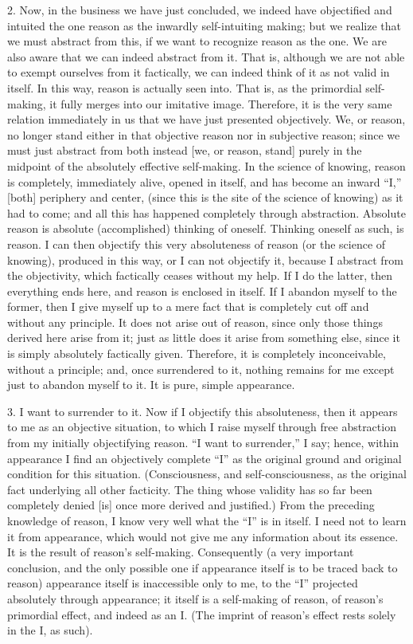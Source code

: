 2. Now, in the business we have just concluded,
we indeed have objectified and intuited the one reason
as the inwardly self-intuiting making;
but we realize that we must abstract from this,
if we want to recognize reason as the one.
We are also aware that we can indeed abstract from it.
That is, although we are not able
to exempt ourselves from it factically,
we can indeed think of it as not valid in itself.
In this way, reason is actually seen into.
That is, as the primordial self-making,
it fully merges into our imitative image.
Therefore, it is the very same relation
immediately in us that we have just presented objectively.
We, or reason, no longer stand
either in that objective reason
nor in subjective reason;
since we must just abstract from both
instead [we, or reason, stand] purely in
the midpoint of the absolutely effective self-making.
In the science of knowing,
reason is completely, immediately alive,
opened in itself,
and has become an inward “I,”
[both] periphery and center,
(since this is the site of the science of knowing)
as it had to come;
and all this has happened
completely through abstraction.
Absolute reason is absolute
(accomplished) thinking of oneself.
Thinking oneself as such, is reason.
I can then objectify this
very absoluteness of reason
(or the science of knowing),
produced in this way,
or I can not objectify it,
because I abstract from the objectivity,
which factically ceases without my help.
If I do the latter,
then everything ends here,
and reason is enclosed in itself.
If I abandon myself to the former,
then I give myself up to a mere fact
that is completely cut off
and without any principle.
It does not arise out of reason,
since only those things derived here arise from it;
just as little does it arise from something else,
since it is simply absolutely factically given.
Therefore, it is completely inconceivable,
without a principle;
and, once surrendered to it,
nothing remains for me
except just to abandon myself to it.
It is pure, simple appearance.

3. I want to surrender to it.
Now if I objectify this absoluteness,
then it appears to me as an objective situation,
to which I raise myself through free abstraction
from my initially objectifying reason.
“I want to surrender,”  I say;
hence, within appearance I find
an objectively complete “I”
as the original ground and original condition
for this situation.
(Consciousness, and self-consciousness,
as the original fact underlying all other facticity.
The thing whose validity has so far been completely denied [is]
once more derived and justified.)
From the preceding knowledge of reason,
I know very well what the “I” is in itself.
I need not to learn it from appearance,
which would not give me any information about its essence.
It is the result of reason’s self-making.
Consequently
(a very important conclusion,
and the only possible one if appearance itself is
to be traced back to reason)
appearance itself is inaccessible only to me,
to the “I” projected absolutely through appearance;
it itself is a self-making of reason,
of reason’s primordial effect,
and indeed as an I.
(The imprint of reason’s effect
rests solely in the I, as such).

